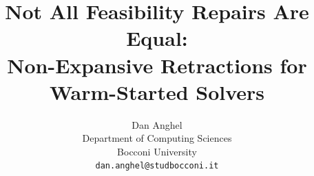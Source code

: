 \usepackage[dblblindworkshop,final]{neurips_2026}

\usepackage[utf8]{inputenc}
\usepackage[T1]{fontenc}
\usepackage[hidelinks]{hyperref}
\usepackage{url}
\usepackage{booktabs}
\usepackage{amsfonts}
\usepackage{amsmath}
\usepackage{amssymb}
\usepackage{amsthm}
\usepackage{nicefrac}
\usepackage{microtype}
\usepackage{xcolor}   %

\newtheorem{theorem}{Theorem}
\newtheorem{lemma}[theorem]{Lemma}
\newtheorem{proposition}[theorem]{Proposition}
\newtheorem{corollary}[theorem]{Corollary}
\theoremstyle{definition}
\newtheorem{definition}[theorem]{Definition}
\newtheorem{remark}[theorem]{Remark}
\newtheorem{observation}[theorem]{Observation}

\newcommand{\R}{\mathbb{R}}
\newcommand{\Z}{\mathbb{Z}}
\newcommand{\opt}{\mathrm{OPT}}
\newcommand{\repair}{\mathcal{R}}
\newcommand{\dfeas}{\mathcal{D}}
\newcommand{\std}[1]{{\scriptstyle\,\pm#1}}

\newcommand{\authortodo}[1]{\textcolor{red}{[#1]}}
\newcommand{\coderepo}{\url{https://github.com/dananghel/feasibility-repairs}}
\newcommand{\codelicence}{MIT}

\title{Not All Feasibility Repairs Are Equal:\\
Non-Expansive Retractions for Warm-Started Solvers}

\author{%
  Dan Anghel\\
  Department of Computing Sciences\\
  Bocconi University\\
  \texttt{dan.anghel@studbocconi.it}
}
